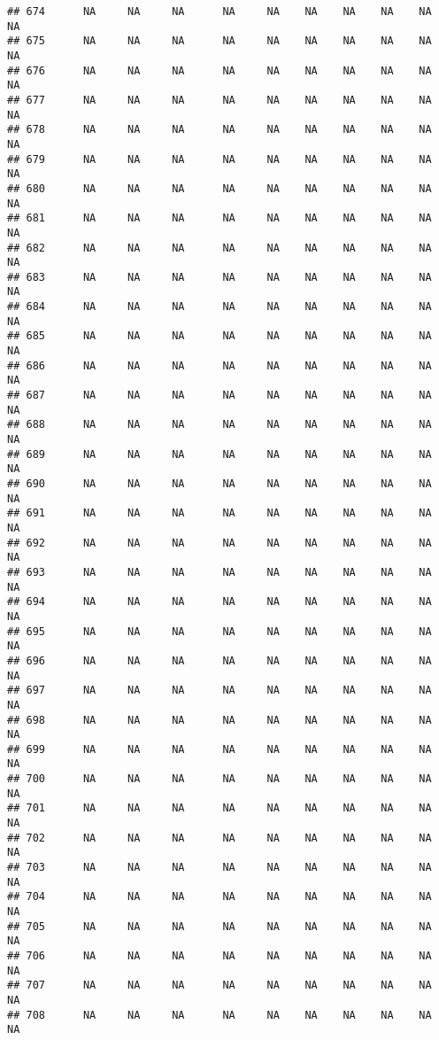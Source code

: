 \documentclass{article}\usepackage{graphicx, color}
\makeatletter
\newenvironment{kframe}{%
 \def\at@end@of@kframe{}%
 \ifinner\ifhmode%
  \def\at@end@of@kframe{\end{minipage}}%
  \begin{minipage}{\columnwidth}%
 \fi\fi%
 \def\FrameCommand##1{\hskip\@totalleftmargin \hskip-\fboxsep
 \colorbox{shadecolor}{##1}\hskip-\fboxsep
     \hskip-\linewidth \hskip-\@totalleftmargin \hskip\columnwidth}%
 \MakeFramed {\advance\hsize-\width
   \@totalleftmargin\z@ \linewidth\hsize
   \@setminipage}}%
 {\par\unskip\endMakeFramed%
 \at@end@of@kframe}
\newenvironment{knitrout}{}{} %
\makeatother
\begin{document}
\begin{knitrout}
\begin{kframe}
\begin{verbatim}
## 674      NA     NA     NA      NA     NA    NA    NA    NA    NA     NA
## 675      NA     NA     NA      NA     NA    NA    NA    NA    NA     NA
## 676      NA     NA     NA      NA     NA    NA    NA    NA    NA     NA
## 677      NA     NA     NA      NA     NA    NA    NA    NA    NA     NA
## 678      NA     NA     NA      NA     NA    NA    NA    NA    NA     NA
## 679      NA     NA     NA      NA     NA    NA    NA    NA    NA     NA
## 680      NA     NA     NA      NA     NA    NA    NA    NA    NA     NA
## 681      NA     NA     NA      NA     NA    NA    NA    NA    NA     NA
## 682      NA     NA     NA      NA     NA    NA    NA    NA    NA     NA
## 683      NA     NA     NA      NA     NA    NA    NA    NA    NA     NA
## 684      NA     NA     NA      NA     NA    NA    NA    NA    NA     NA
## 685      NA     NA     NA      NA     NA    NA    NA    NA    NA     NA
## 686      NA     NA     NA      NA     NA    NA    NA    NA    NA     NA
## 687      NA     NA     NA      NA     NA    NA    NA    NA    NA     NA
## 688      NA     NA     NA      NA     NA    NA    NA    NA    NA     NA
## 689      NA     NA     NA      NA     NA    NA    NA    NA    NA     NA
## 690      NA     NA     NA      NA     NA    NA    NA    NA    NA     NA
## 691      NA     NA     NA      NA     NA    NA    NA    NA    NA     NA
## 692      NA     NA     NA      NA     NA    NA    NA    NA    NA     NA
## 693      NA     NA     NA      NA     NA    NA    NA    NA    NA     NA
## 694      NA     NA     NA      NA     NA    NA    NA    NA    NA     NA
## 695      NA     NA     NA      NA     NA    NA    NA    NA    NA     NA
## 696      NA     NA     NA      NA     NA    NA    NA    NA    NA     NA
## 697      NA     NA     NA      NA     NA    NA    NA    NA    NA     NA
## 698      NA     NA     NA      NA     NA    NA    NA    NA    NA     NA
## 699      NA     NA     NA      NA     NA    NA    NA    NA    NA     NA
## 700      NA     NA     NA      NA     NA    NA    NA    NA    NA     NA
## 701      NA     NA     NA      NA     NA    NA    NA    NA    NA     NA
## 702      NA     NA     NA      NA     NA    NA    NA    NA    NA     NA
## 703      NA     NA     NA      NA     NA    NA    NA    NA    NA     NA
## 704      NA     NA     NA      NA     NA    NA    NA    NA    NA     NA
## 705      NA     NA     NA      NA     NA    NA    NA    NA    NA     NA
## 706      NA     NA     NA      NA     NA    NA    NA    NA    NA     NA
## 707      NA     NA     NA      NA     NA    NA    NA    NA    NA     NA
## 708      NA     NA     NA      NA     NA    NA    NA    NA    NA     NA

\end{verbatim}
\end{kframe}
\end{knitrout}
\end{document}
